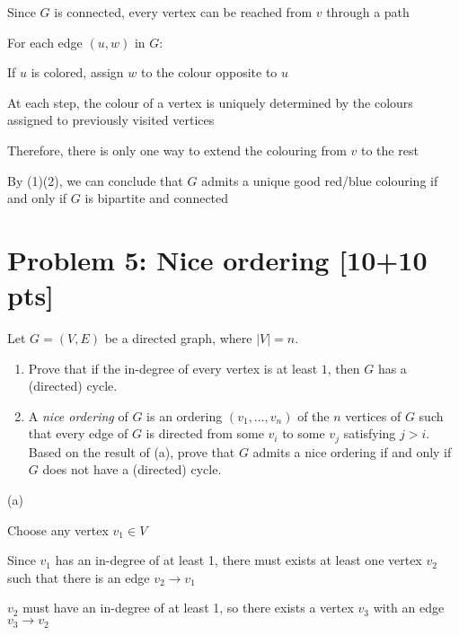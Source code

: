 \documentclass[11pt,twoside]{article}
\newcommand{\problem}[1]{\section*{Problem #1}}
\begin{document}
Since $G$ is connected, every vertex can be reached from $v$ through a path

For each edge $(u,w)$ in $G$:

\qquad If $u$ is colored, assign $w$ to the colour opposite to $u$

At each step, the colour of a vertex is uniquely determined by the colours assigned to previously visited vertices

Therefore, there is only one way to extend the colouring from $v$ to the rest

\hspace*{\fill}

By (1)(2), we can conclude that $G$ admits a unique good red/blue colouring if and only if $G$ is bipartite and connected




\problem{5: Nice ordering [10+10 pts]}
Let $G = (V,E)$ be a directed graph, where $|V| = n$.
\begin{enumerate}
    \item Prove that if the in-degree of every vertex is at least $1$, then $G$ has a (directed) cycle.
    \item A \textit{nice ordering} of $G$ is an ordering $(v_1,\dots,v_n)$ of the $n$ vertices of $G$ such that every edge of $G$ is directed from some $v_i$ to some $v_j$ satisfying $j>i$.
    Based on the result of (a), prove that $G$ admits a nice ordering if and only if $G$ does not have a (directed) cycle.
\end{enumerate}


\hspace*{\fill}

(a)

Choose any vertex $v_1 \in V$

Since $v_1$ has an in-degree of at least 1, there must exists at least one vertex $v_2$ such that there is an edge $v_2 \rightarrow v_1$

$v_2$ must have an in-degree of at least 1, so there exists a vertex $v_3$ with an edge $v_3 \rightarrow v_2$
\end{document}
